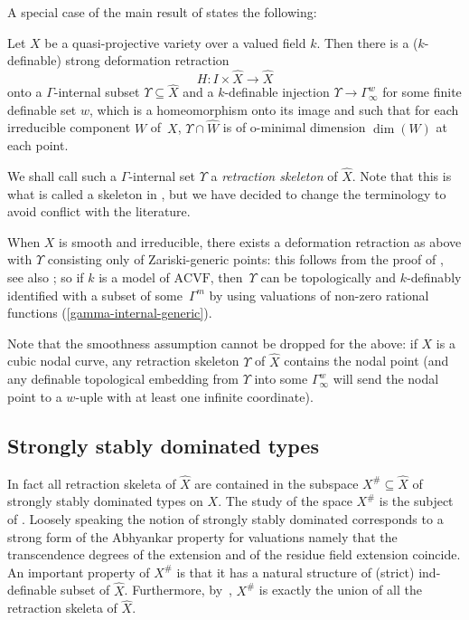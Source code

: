 \documentclass[JEP,XML,SOM,Unicode,ThmDefs,NoEqCountersInSection,published]{cedram}
\newcommand{\acvf}{\mathrm{ACVF}}
\theoremstyle{plain}
\theoremstyle{definition}
\begin{document}
A special case of the main result of \cite{HL} states the following:

\begin{theo}\label{ret-theo}Let $X$ be a quasi-projective variety over a valued field $k$.
Then there is a ($k$-definable) strong deformation retraction
\[
H: I \times \widehat{X} \longrightarrow \widehat{X}
\]
onto a $\Gamma$-internal subset $\Upsilon \subseteq \widehat{X}$ and a $k$-definable injection $\Upsilon
\to \Gamma_{\infty}^w$ for some finite definable set $w$, which is a homeomorphism onto its image and
such that for each irreducible component $W$ of~$X$, $\Upsilon \cap \widehat{W}$ is of o-minimal dimension
$\dim (W)$ at each point.
\end{theo}

We shall call such a $\Gamma$-internal set $\Upsilon$ a \emph{retraction skeleton} of $\widehat{X}$.
Note that this is what is called a skeleton in \cite{HL}, but we have decided to change the terminology to avoid conflict with the literature.

\begin{rema}
When $X$ is smooth and irreducible,
there exists a deformation retraction as above with $\Upsilon$
consisting only of Zariski-generic points: this follows from the proof of \cite[Th.\,11.1.1]{HL}, see also \cite[Ch.\,12]{HL};
so if $k$ is a model of $\acvf$, then~$\Upsilon$ can be topologically and $k$-definably identified
with a subset of some~$\Gamma^m$ by using valuations of non-zero rational functions
(\ref{gamma-internal-generic}).

Note that the smoothness assumption cannot be dropped for the above: if $X$ is a cubic nodal curve, any retraction skeleton $\Upsilon$ of
$\widehat X$ contains the nodal point (and
any definable topological embedding
from $\Upsilon$ into some $\Gamma_\infty^w$
will send the nodal point to a $w$-uple with at least one infinite coordinate).
\end{rema}

\subsection{Strongly stably dominated types}In fact all retraction skeleta of $\widehat{X}$ are contained in the subspace $X^{\#} \subseteq \widehat{X}$ of strongly stably dominated types on $X$.
The study of the space $X^{\#}$ is the subject of \cite[Ch.\,8]{HL}. Loosely speaking
the notion of strongly stably dominated corresponds to a strong form of the Abhyankar property for valuations namely that the transcendence degrees of the extension and of the residue field extension coincide.
An important property of
$X^{\#}$ is that it has a natural structure of
(strict) ind-definable subset of $\widehat{X}$. Furthermore, by~\cite[Th.\,8.4.2]{HL},
$X^{\#}$ is exactly the union of all the retraction skeleta of $\widehat{X}$.
\end{document}
